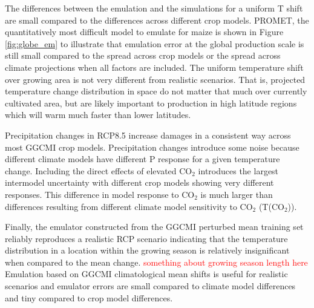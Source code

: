\documentclass[gmd, manuscript]{copernicus} %
\begin{document}
The differences between the emulation and the simulations for a uniform T shift are small compared to the differences across different crop models.
PROMET, the quantitatively most difficult model to emulate for maize is shown in Figure \ref{fig:globe_em} to illustrate that emulation error at the global production scale is still small compared to the spread across crop models or the spread across climate projections when all factors are included.
The uniform temperature shift over growing area is not very different from realistic scenarios. 
That is, projected temperature change distribution in space do not matter that much over currently cultivated area, but are likely important to production in high latitude regions which will warm much faster than lower latitudes.

Precipitation changes in RCP8.5 increase damages in a consistent way across most GGCMI crop models.
Precipitation changes introduce some noise because different climate models have different P response for a given temperature change.
Including the direct effects of elevated CO$_2$ introduces the largest intermodel uncertainty with different crop models showing very different responses. 
This difference in model response to CO$_2$ is much larger than differences resulting from different climate model sensitivity to CO$_2$ (T(CO$_2$)).

Finally, the emulator constructed from the GGCMI perturbed mean training set reliably reproduces a realistic RCP scenario indicating that the temperature distribution in a location within the growing season is relatively insignificant when compared to the mean change.
\textcolor{red}{something about growing season length here}
Emulation based on GGCMI climatological mean shifts is useful for realistic scenarios and emulator errors are small compared to climate model differences and tiny compared to crop model differences.


\end{document}
